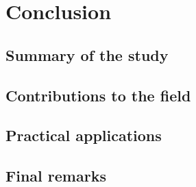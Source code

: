 \chapter{Conclusion}
    \section{Summary of the study}
    \section{Contributions to the field}
    \section{Practical applications}
    \section{Final remarks}